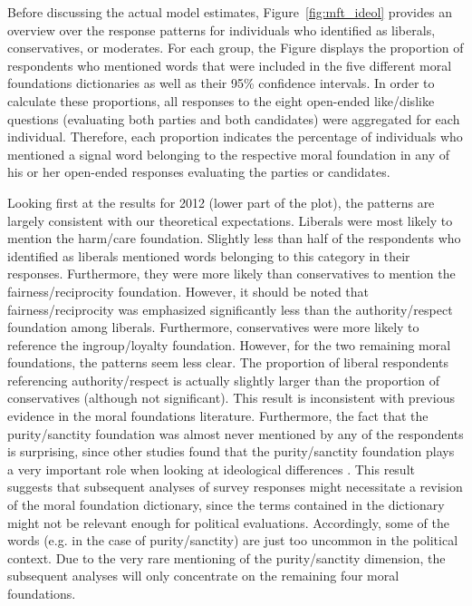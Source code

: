 \documentclass[12pt]{paper}
\begin{document}
Before discussing the actual model estimates, Figure~\ref{fig:mft_ideol} provides an overview over the response patterns for individuals who identified as liberals, conservatives, or moderates. For each group, the Figure displays the proportion of respondents who mentioned words that were included in the five different moral foundations dictionaries as well as their 95\% confidence intervals. In order to calculate these proportions, all responses to the eight open-ended like/dislike questions (evaluating both parties and both candidates) were aggregated for each individual. Therefore, each proportion indicates the percentage of individuals who mentioned a signal word belonging to the respective moral foundation in any of his or her open-ended responses evaluating the parties or candidates.



Looking first at the results for 2012 (lower part of the plot), the patterns are largely consistent with our theoretical expectations. Liberals were most likely to mention the harm/care foundation. Slightly less than half of the respondents who identified as liberals mentioned words belonging to this category in their responses. Furthermore, they were more likely than conservatives to mention the fairness/reciprocity foundation. However, it should be noted that fairness/reciprocity was emphasized significantly less than the authority/respect foundation among liberals. Furthermore, conservatives were more likely to reference the ingroup/loyalty foundation. However, for the two remaining moral foundations, the patterns seem less clear. The proportion of liberal respondents referencing authority/respect is actually slightly larger than the proportion of conservatives (although not significant). This result is inconsistent with previous evidence in the moral foundations literature. Furthermore, the fact that the purity/sanctity foundation was almost never mentioned by any of the respondents is surprising, since other studies found that the purity/sanctity foundation plays a very important role when looking at ideological differences \citep{koleva2012tracing}. This result suggests that subsequent analyses of survey responses might necessitate a revision of the moral foundation dictionary, since the terms contained in the dictionary might not be relevant enough for political evaluations. Accordingly, some of the words (e.g. in the case of purity/sanctity) are just too uncommon in the political context. Due to the very rare mentioning of the purity/sanctity dimension, the subsequent analyses will only concentrate on the remaining four moral foundations.
\end{document}
